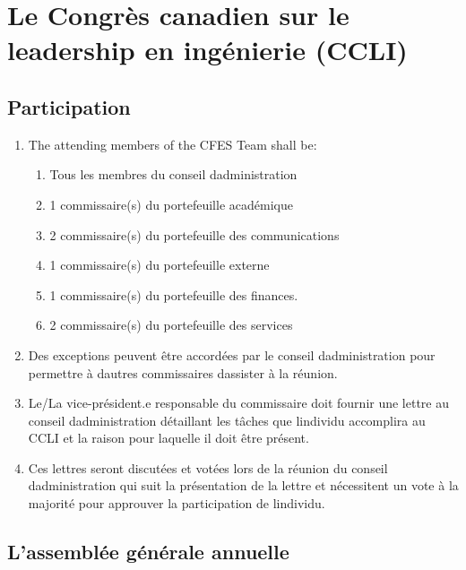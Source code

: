 \section{Le Congrès canadien sur le leadership en ingénierie (CCLI)}
\label{le-congres-canadien-sur-le-leadership-en-ingenierie-ccli}

\subsection{Participation}
\label{participation-2}

\begin{enumerate}
 \item
  The attending members of the CFES Team shall be:

  \begin{enumerate}
   \item
    Tous les membres du conseil d\textquotesingle administration
   \item
    1 commissaire(s) du portefeuille académique
   \item
    2 commissaire(s) du portefeuille des communications
   \item
    1 commissaire(s) du portefeuille externe
   \item
    1 commissaire(s) du portefeuille des finances.
   \item
    2 commissaire(s) du portefeuille des services
  \end{enumerate}

 \item
  Des exceptions peuvent être accordées par le conseil d\textquotesingle administration pour permettre à d\textquotesingle autres commissaires d\textquotesingle assister à la réunion.

 \item
  Le/La vice-président.e responsable du commissaire doit fournir une lettre au conseil d\textquotesingle administration détaillant les tâches que l\textquotesingle individu accomplira au CCLI et la raison pour laquelle il doit être présent.
 \item
  Ces lettres seront discutées et votées lors de la réunion du conseil d\textquotesingle administration qui suit la présentation de la lettre et nécessitent un vote à la majorité pour approuver la participation de l\textquotesingle individu.
\end{enumerate}

\subsection{L'assemblée générale annuelle}
\label{l-assemblee-generale-annuelle}

